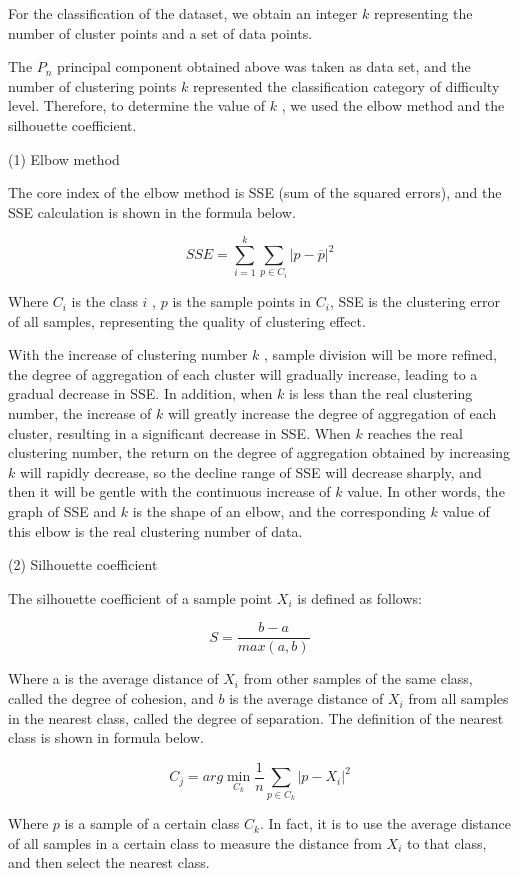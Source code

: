 \documentclass[
  journal=medium,
  manuscript=Report,
  year=2023,
  volume=37,
]{cup-journal}
\begin{document}
For the classification of the dataset, we obtain an integer $k$ representing the number of cluster points and a set of data points. 

The $P_n$ principal component obtained above was taken as data set, and the number of clustering points $k$ represented the classification category of difficulty level. Therefore, to determine the value of $k$ , we used the elbow method and the silhouette coefficient. 

(1) Elbow method

The core index of the elbow method is SSE (sum of the squared errors), and the SSE calculation is shown in the formula below.

$$SSE = \sum_{i=1}^{k}\sum_{p \in C_i}|p-\overline{p}|^2$$

Where $C_i$ is the class $i$ , $p$ is the sample points in $C_i$, SSE is the clustering error of all samples, representing the quality of clustering effect. 

With the increase of clustering number $k$ , sample division will be more refined, the degree of aggregation of each cluster will gradually increase, leading to a gradual decrease in SSE. In addition, when $k$ is less than the real clustering number, the increase of $k$ will greatly increase the degree of aggregation of each cluster, resulting in a significant decrease in SSE. When $k$ reaches the real clustering number, the return on the degree of aggregation obtained by increasing $k$ will rapidly decrease, so the decline range of SSE will decrease sharply, and then it will be gentle with the continuous increase of $k$ value. In other words, the graph of SSE and $k$ is the shape of an elbow, and the corresponding $k$ value of this elbow is the real clustering number of data.

(2) Silhouette coefficient

The silhouette coefficient of a sample point $X_i$ is defined as follows:

$$S = \frac{b-a}{max(a,b)}$$

Where a is the average distance of $X_i$ from other samples of the same class, called the degree of cohesion, and $b$ is the average distance of $X_i$ from all samples in the nearest class, called the degree of separation. The definition of the nearest class is shown in formula below.

$$C_j = arg \min_{C_k}\frac{1}{n}\sum_{p \in C_k}|p-X_i|^2$$

Where $p$ is a sample of a certain class $C_k$. In fact, it is to use the average distance of all samples in a certain class to measure the distance from $X_i$ to that class, and then select the nearest class. 
\end{document}
